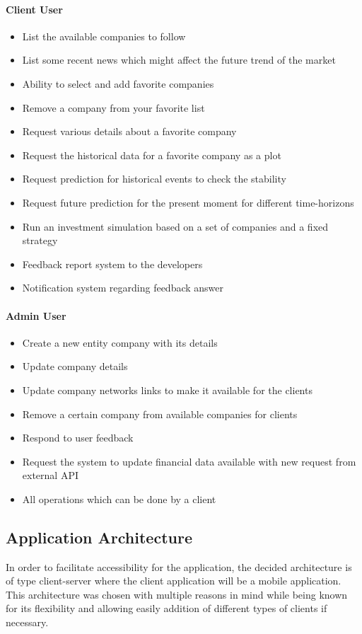 \paragraph{Client User}
\begin{itemize}
    \item List the available companies to follow
    \item List some recent news which might affect the future trend of the market
    \item Ability to select and add favorite companies
    \item Remove a company from your favorite list
    \item Request various details about a favorite company
    \item Request the historical data for a favorite company as a plot
    \item Request prediction for historical events to check the stability
    \item Request future prediction for the present moment for different time-horizons
    \item Run an investment simulation based on a set of companies and a fixed strategy
    \item Feedback report system to the developers
    \item Notification system regarding feedback answer
\end{itemize}

\paragraph{Admin User}
\begin{itemize}
    \item Create a new entity company with its details
    \item Update company details
    \item Update company networks links to make it available for the clients
    \item Remove a certain company from available companies for clients
    \item Respond to user feedback
    \item Request the system to update financial data available with new request from external API
    
    \item All operations which can be done by a client
\end{itemize}

\subsection{Application Architecture}
In order to facilitate accessibility for the application, the decided architecture is of type client-server where the client application will be a mobile application. This architecture was chosen with multiple reasons in mind while being known for its flexibility and allowing easily addition of different types of clients if necessary.

